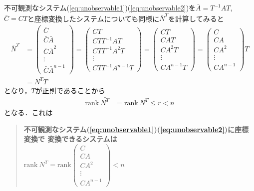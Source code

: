 不可観測なシステム(\ref{eq:unobservable1})(\ref{eq:unobservable2})を$\bar{A}= T^{-1} A T$, $\bar{C} = C T$と座標変換したシステムについても同様に$\bar{N}^T$を計算してみると
\begin{align}
 \bar{N}^T 
 &= 
  \left(\begin{array}{c}
     \bar{C}        \\
	 \bar{C} \bar{A}      \\
	 \bar{C} \bar{A}^2    \\
	 \vdots   \\
	 \bar{C} \bar{A}^{n-1}
	\end{array}\right)
 = 
  \left(\begin{array}{c}
     CT        \\
	 CT T^{-1}AT      \\
	 CT T^{-1}A^2T    \\
	 \vdots   \\
	 CT T^{-1}A^{n-1}T
	\end{array}\right)
 =
  \left(\begin{array}{c}
     C T       \\
	 C A T     \\
	 C A^2 T   \\
	 \vdots   \\
	 C A^{n-1}T
	\end{array}\right)
 =
  \left(\begin{array}{c}
         C        \\
	 C A      \\
	 C A^2    \\
	 \vdots   \\
	 C A^{n-1}
	\end{array}\right)
	T
\nonumber \\
 &= N^T T
\end{align}
となり，$T$が正則であることから
\begin{align}
 \mbox{rank}\ \bar{N^T} & = \mbox{rank}\ {N^T} \leq r < n
\end{align}
となる．これは
\begin{quote}
   {\bf 不可観測なシステム(\ref{eq:unobservable1})(\ref{eq:unobservable2})に座標変換で
   変換できるシステムは\\
   $\mbox{rank}\ N^T 
   = \mbox{rank} 
	  \left(\begin{array}{c}
	         C        \\
		 C A      \\
		 C A^2    \\
		 \vdots   \\
		 C A^{n-1}
		\end{array}\right)
    < n$}
\end{quote}
